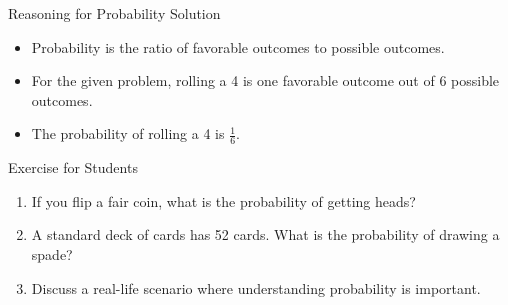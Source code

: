 \begin{frame}{Reasoning for Probability Solution}
  \begin{itemize}
    \item Probability is the ratio of favorable outcomes to possible outcomes.
    \item For the given problem, rolling a 4 is one favorable outcome out of 6 possible outcomes.
    \item The probability of rolling a 4 is $\frac{1}{6}$.
  \end{itemize}
\end{frame}

\begin{frame}{Exercise for Students}
  \begin{enumerate}
    \item If you flip a fair coin, what is the probability of getting heads?
    \item A standard deck of cards has 52 cards. What is the probability of drawing a spade?
    \item Discuss a real-life scenario where understanding probability is important.
  \end{enumerate}
\end{frame}
